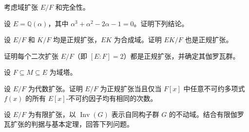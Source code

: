\noindent\begin{minipage}{\textwidth}
考虑域扩张 $E/F$ 和完全性。
\end{minipage}\par\vfill
\newpage
\noindent\begin{minipage}{\textwidth}
设 $E=\mathbb Q(\alpha)$，其中 $\alpha^3+\alpha^2-2\alpha-1=0$。证明下列结论。
\end{minipage}\par\vfill
\noindent\begin{minipage}{\textwidth}
设 $E/F$ 和 $K/F$ 均是正规扩张，$EK$ 为合成域。证明 $EK/F$ 也是正规扩张。
\end{minipage}\par\vfill
\noindent\begin{minipage}{\textwidth}
证明每个二次扩张 $E/F$（即 $[E:F]=2$）都是正规扩张，并确定其伽罗瓦群。
\end{minipage}\par\vfill
\newpage
\noindent\begin{minipage}{\textwidth}
设 $F\subseteq M\subseteq E$ 为域塔。
\end{minipage}\par\vfill
\noindent\begin{minipage}{\textwidth}
设 $E/F$ 为代数扩张。证明 $E/F$ 为正规扩张当且仅当 $F[x]$ 中任意不可约多项式 $f(x)$ 的所有 $E[x]$-不可约因子均有相同的次数。
\end{minipage}\par\vfill
\noindent\begin{minipage}{\textwidth}
设 $E/F$ 为有限扩张，以 $\operatorname{Inv}(G)$ 表示自同构子群 $G$ 的不动域。结合有限伽罗瓦扩张的判据与基本定理，回答下列问题。
\end{minipage}\par\vfill
